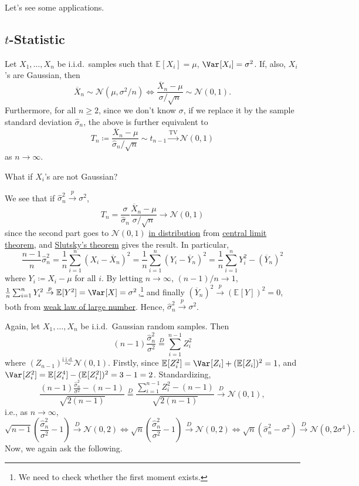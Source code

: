 Let's see some applications.

\subsection{\(t\)-Statistic}
Let \(X_1, \dots , X_n\) be i.i.d.\ samples such that \(\mathbb{E}_{}[X_i] = \mu \), \(\Var_{}[X_i] = \sigma ^2\). If, also, \(X_i\)'s are Gaussian, then
\[
	\overline{X} _n \sim \mathcal{N} (\mu , \sigma ^2 / n)
	\iff \frac{\overline{X} _n - \mu }{\sigma / \sqrt{n} } \sim \mathcal{N} (0, 1).
\]
Furthermore, for all \(n \geq 2\), since we don't know \(\sigma \), if we replace it by the sample standard deviation \(\hat{\sigma} _n\), the above is further equivalent to
\[
	T_n \coloneqq \frac{\overline{X} _n - \mu }{\hat{\sigma} _n / \sqrt{n} } \sim t_{n-1} \overset{\operatorname{TV}}{\to } \mathcal{N} (0, 1)
\]
as \(n \to \infty \).

\begin{problem*}
	What if \(X_i\)'s are not Gaussian?
\end{problem*}
\begin{answer}
	We see that if \(\hat{\sigma} _n ^2 \overset{p}{\to } \sigma ^2\),
	\[
		T_n
		= \frac{\sigma }{\hat{\sigma} _n} \frac{\overline{X} _n - \mu }{\sigma / \sqrt{n} }
		\to \mathcal{N} (0, 1)
	\]
	since the second part goes to \(\mathcal{N} (0, 1)\) \hyperref[def:converge-in-distribution]{in distribution} from \hyperref[thm:CLT]{central limit theorem}, and \hyperref[thm:Slutsky]{Slutsky's theorem} gives the result. In particular,
	\[
		\frac{n-1}{n} \hat{\sigma} _n^2
		= \frac{1}{n} \sum_{i=1}^{n} \left( X_i - \overline{X} _n\right) ^2
		= \frac{1}{n} \sum_{i=1}^{n} \left( Y_i - \overline{Y} _n\right) ^2
		= \frac{1}{n} \sum_{i=1}^{n} Y_i^2 - (\overline{Y} _n)^2
	\]
	where \(Y_i \coloneqq X_i - \mu \) for all \(i\). By letting \(n \to \infty \), \((n-1) / n \to 1\), \(\frac{1}{n} \sum_{i=1}^{n} Y_i^2 \overset{p}{\to } \mathbb{E}_{}[Y^2] = \Var_{}[X] = \sigma ^2\),\footnote{We need to check whether the first moment exists.} and finally \((\overline{Y} _n)^2 \overset{p}{\to } (\mathbb{E}_{}[Y])^2 = 0\), both from \hyperref[thm:WLLN]{weak law of large number}. Hence, \(\hat{\sigma} _n^2 \overset{p}{\to } \sigma ^2\).
\end{answer}

Again, let \(X_1, \dots , X_n\) be i.i.d.\ Gaussian random samples. Then
\[
	(n-1) \frac{\hat{\sigma} _n^2}{\sigma ^2}
	\overset{D}{=} \sum_{i=1}^{n-1} Z_i^2
\]
where \((Z_{n-1}) \overset{\text{i.i.d.} }{\sim } \mathcal{N} (0, 1)\). Firstly, since \(\mathbb{E}_{}[Z_i^2] = \Var_{}[Z_i] + (\mathbb{E}_{}[Z_i] )^2 = 1\), and \(\Var_{}[Z_i^2] = \mathbb{E}_{}[Z_i^4] - (\mathbb{E}_{}[Z_i^2] )^2 = 3 - 1 = 2\). Standardizing,
\[
	\frac{(n-1) \frac{\hat{\sigma} _n^2}{\sigma ^2} - (n - 1)}{\sqrt{2 (n-1)} }
	\overset{D}{=} \frac{\sum_{i=1}^{n-1} Z_i^2 - (n-1)}{\sqrt{2 (n-1)} }
	\overset{D}{\to } \mathcal{N} (0, 1),
\]
i.e., as \(n \to \infty \),
\[
	\sqrt{n-1} \left( \frac{\hat{\sigma} _n^2}{\sigma ^2} - 1 \right)  \overset{D}{\to } \mathcal{N} (0, 2)
	\iff \sqrt{n} \left( \frac{\hat{\sigma} _n^2}{\sigma ^2} - 1 \right)  \overset{D}{\to } \mathcal{N} (0, 2)
	\iff \sqrt{n} (\hat{\sigma} _n^2 - \sigma ^2) \overset{D}{\to } \mathcal{N} (0, 2 \sigma ^4).
\]
Now, we again ask the following.

